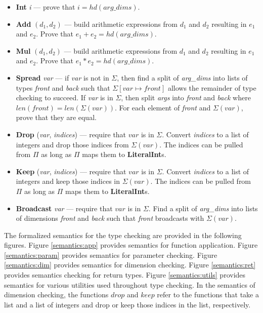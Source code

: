\documentclass{report}
\begin{document}
\begin{enumerate}[label=\arabic*.]
\begin{itemize}
        \item \textbf{Int} \textit{i} --- prove that $i = hd(arg\_dims)$.

        \item \textbf{Add} $(d_1, d_2)$ --- build arithmetic expressions from $d_1$ and $d_2$ resulting in $e_1$ and $e_2$. Prove that $e_1 + e_2 = hd(arg\_dims)$.

        \item \textbf{Mul} $(d_1, d_2)$ --- build arithmetic expressions from $d_1$ and $d_2$ resulting in $e_1$ and $e_2$. Prove that $e_1 * e_2 = hd(arg\_dims)$.

        \item \textbf{Spread} \textit{var} --- if \textit{var} is not in $\Sigma$, then find a split of \textit{arg\_dims} into lists of types \textit{front} and \textit{back} such that $\Sigma[var \mapsto front]$ allows the remainder of type checking to succeed. If \textit{var} is in $\Sigma$, then split \textit{args} into \textit{front} and \textit{back} where $len(front) = len(\Sigma(var))$. For each element of \textit{front} and $\Sigma(var)$, prove that they are equal.

        \item \textbf{Drop} (\textit{var}, \textit{indices}) --- require that $var$ is in $\Sigma$. Convert \textit{indices} to a list of integers and drop those indices from $\Sigma(var)$. The indices can be pulled from $\Pi$ as long as $\Pi$ maps them to \textbf{LiteralInt}s.

        \item \textbf{Keep} (\textit{var}, \textit{indices}) --- require that $var$ is in $\Sigma$. Convert \textit{indices} to a list of integers and keep those indices in $\Sigma(var)$. The indices can be pulled from $\Pi$ as long as $\Pi$ maps them to \textbf{LiteralInt}s.

        \item \textbf{Broadcast} \textit{var} --- require that $var$ is in $\Sigma$. Find a split of \textit{arg\_dims} into lists of dimensions \textit{front} and \textit{back} such that \textit{front} broadcasts with $\Sigma(var)$.

    \end{itemize}
\end{enumerate}
The formalized semantics for the type checking are provided in the following figures. Figure \ref{semantics:app} provides semantics for function application. Figure \ref{semantics:param} provides semantics for parameter checking. Figure \ref{semantics:dim} provides semantics for dimension checking. Figure \ref{semantics:ret} provides semantics checking for return types. Figure \ref{semantics:utils} provides semantics for various utilities used throughout type checking. In the semantics of dimension checking, the functions $drop$ and $keep$ refer to the functions that take a list and a list of integers and drop or keep those indices in the list, respectively.
\end{document}
